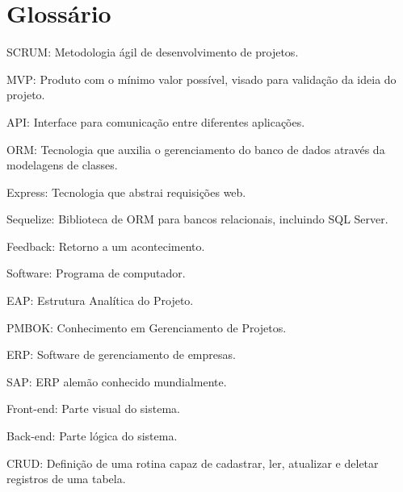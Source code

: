 \section{Glossário}
SCRUM:		Metodologia ágil de desenvolvimento de projetos.

MVP:		Produto com o mínimo valor possível, visado para validação da ideia do projeto.

API:		Interface para comunicação entre diferentes aplicações.

ORM:		Tecnologia que auxilia o gerenciamento do banco de dados através da modelagens de classes.

Express:	Tecnologia que abstrai requisições web.

Sequelize:	Biblioteca de ORM para bancos relacionais, incluindo SQL Server.

Feedback:	Retorno a um acontecimento.

Software:	Programa de computador.

EAP:		Estrutura Analítica do Projeto.

PMBOK:      Conhecimento em Gerenciamento de Projetos.

ERP:        Software de gerenciamento de empresas.

SAP:        ERP alemão conhecido mundialmente.

Front-end:	Parte visual do sistema.

Back-end:	Parte lógica do sistema.

CRUD:	  	Definição de uma rotina capaz de cadastrar, ler, atualizar e deletar registros de uma tabela.






